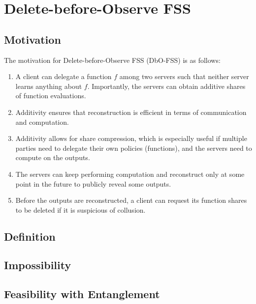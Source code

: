 \section{Delete-before-Observe FSS}\label{sec:dbo-fss}

\subsection{Motivation}

The motivation for Delete-before-Observe FSS (DbO-FSS) is as
follows:

\begin{enumerate}
\item A client can delegate a function $f$ among two servers such
that neither server learns anything about $f$. Importantly, the
servers can obtain additive shares of function evaluations.

\item Additivity ensures that reconstruction is efficient in terms
of communication and computation.

\item Additivity allows for share compression, which is especially
useful if multiple parties need to delegate their own policies
(functions), and the servers need to compute on the outputs.

\item The servers can keep performing computation and reconstruct
only at some point in the future to publicly reveal some outputs.

\item Before the outputs are reconstructed, a client can request its
function shares to be deleted if it is suspicious of collusion.
\end{enumerate}


\subsection{Definition}

\subsection{Impossibility}

\subsection{Feasibility with Entanglement}

